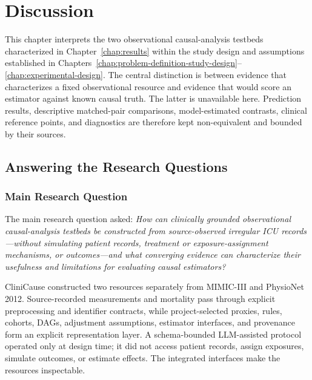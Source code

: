 \chapter{Discussion}
\label{chap:discussion}

This chapter interprets the two observational causal-analysis testbeds characterized in Chapter~\ref{chap:results} within the study design and assumptions established in Chapters~\ref{chap:problem-definition-study-design}--\ref{chap:experimental-design}.  The central distinction is between evidence that characterizes a fixed observational resource and evidence that would score an estimator against known causal truth.  The latter is unavailable here.  Prediction results, descriptive matched-pair comparisons, model-estimated contrasts, clinical reference points, and diagnostics are therefore kept non-equivalent and bounded by their sources.

\section{Answering the Research Questions}
\label{sec:discussion:answer-research-questions}

\subsection{Main Research Question}
\label{subsec:discussion:main-rq}

The main research question asked: \emph{How can clinically grounded observational causal-analysis testbeds be constructed from source-observed irregular ICU records---without simulating patient records, treatment or exposure-assignment mechanisms, or outcomes---and what converging evidence can characterize their usefulness and limitations for evaluating causal estimators?}

CliniCause constructed two resources separately from MIMIC-III and PhysioNet 2012.  Source-recorded measurements and mortality pass through explicit preprocessing and identifier contracts, while project-selected proxies, rules, cohorts, DAGs, adjustment assumptions, estimator interfaces, and provenance form an explicit representation layer.  A schema-bounded LLM-assisted protocol operated only at design time; it did not access patient records, assign exposures, simulate outcomes, or estimate effects.  The integrated interfaces make the resources inspectable.


